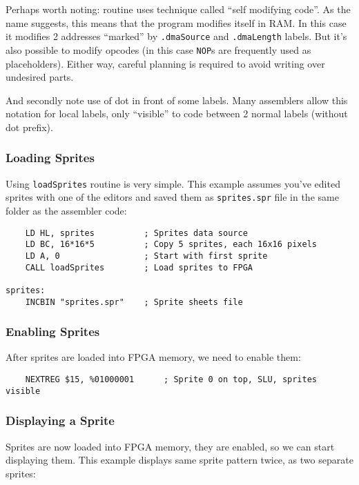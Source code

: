 \documentclass[12pt,twoside,openright,a4paper]{book}
\begin{document}
Perhaps worth noting: routine uses technique called ``self modifying code''. As the name suggests, this means that the program modifies itself in RAM. In this case it modifies 2 addresses ``marked'' by {\tt .dmaSource} and {\tt .dmaLength} labels. But it's also possible to modify opcodes (in this case {\tt NOP}s are frequently used as placeholders). Either way, careful planning is required to avoid writing over undesired parts.

And secondly note use of dot in front of some labels. Many assemblers allow this notation for local labels, only ``visible'' to code between 2 normal labels (without dot prefix).


\pagebreak
\subsubsection{Loading Sprites}

Using {\tt loadSprites} routine is very simple. This example assumes you've edited sprites with one of the editors and saved them as {\tt sprites.spr} file in the same folder as the assembler code:

\begin{lstlisting}
	LD HL, sprites          ; Sprites data source
	LD BC, 16*16*5          ; Copy 5 sprites, each 16x16 pixels
	LD A, 0                 ; Start with first sprite
	CALL loadSprites        ; Load sprites to FPGA

sprites:
	INCBIN "sprites.spr"    ; Sprite sheets file
\end{lstlisting}


\subsubsection{Enabling Sprites}

After sprites are loaded into FPGA memory, we need to enable them:

\begin{lstlisting}
	NEXTREG $15, %01000001		; Sprite 0 on top, SLU, sprites visible
\end{lstlisting}


\subsubsection{Displaying a Sprite}

Sprites are now loaded into FPGA memory, they are enabled, so we can start displaying them. This example displays same sprite pattern twice, as two separate sprites:
\end{document}
